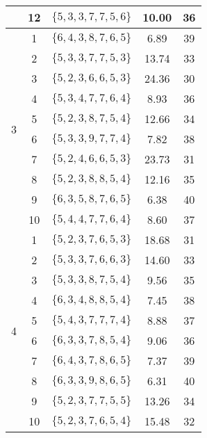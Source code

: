 \begin{table}
\begin{tabular}{ |c c c c c|  }
                           & 12 & $\{5, 3, 3, 7, 7, 5, 6\}$ & 10.00 & 36 \\
        \hline
        \multirow{10}{*}{3} & 1  & $\{6, 4, 3, 8, 7, 6, 5\}$ & 6.89  & 39 \\
                           & 2  & $\{5, 3, 3, 7, 7, 5, 3\}$ & 13.74 & 33 \\
                           & 3  & $\{5, 2, 3, 6, 6, 5, 3\}$ & 24.36 & 30 \\
                           & 4  & $\{5, 3, 4, 7, 7, 6, 4\}$ & 8.93 & 36 \\
                           & 5  & $\{5, 2, 3, 8, 7, 5, 4\}$ & 12.66 & 34 \\
                           & 6  & $\{5, 3, 3, 9, 7, 7, 4\}$ & 7.82 & 38 \\
                           & 7  & $\{5, 2, 4, 6, 6, 5, 3\}$ & 23.73 & 31 \\
                           & 8  & $\{5, 2, 3, 8, 8, 5, 4\}$ & 12.16 & 35 \\
                           & 9  & $\{6, 3, 5, 8, 7, 6, 5\}$ & 6.38 & 40 \\
                           & 10 & $\{5, 4, 4, 7, 7, 6, 4\}$ & 8.60 & 37 \\
        \hline
        \multirow{10}{*}{4} & 1  & $\{5, 2, 3, 7, 6, 5, 3\}$ & 18.68  & 31 \\
                           & 2  & $\{5, 3, 3, 7, 6, 6, 3\}$ & 14.60 & 33 \\
                           & 3  & $\{5, 3, 3, 8, 7, 5, 4\}$ & 9.56 & 35 \\
                           & 4  & $\{6, 3, 4, 8, 8, 5, 4\}$ & 7.45 & 38 \\
                           & 5  & $\{5, 4, 3, 7, 7, 7, 4\}$ & 8.88 & 37 \\
                           & 6  & $\{6, 3, 3, 7, 8, 5, 4\}$ & 9.06 & 36 \\
                           & 7  & $\{6, 4, 3, 7, 8, 6, 5\}$ & 7.37 & 39 \\
                           & 8  & $\{6, 3, 3, 9, 8, 6, 5\}$ & 6.31 & 40 \\
                           & 9  & $\{5, 2, 3, 7, 7, 5, 5\}$ & 13.26 & 34 \\
                           & 10 & $\{5, 2, 3, 7, 6, 5, 4\}$ & 15.48 & 32 \\
        \hline
    \end{tabular}
    
    \label{tab:our_solutions}
\end{table}
